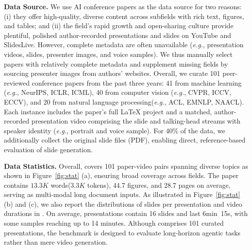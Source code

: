 \vspace{-0.2\baselineskip}
\textbf{Data Source.} We use AI conference papers as the data source for two reasons: (i) they offer high-quality, diverse content across subfields with rich text, figures, and tables; and (ii) the field’s rapid growth and open-sharing culture provide plentiful, polished author-recorded presentations and slides on YouTube and SlidesLive. However, complete metadata are often unavailable (\textit{e.g.}, presentation videos, slides, presenter images, and voice samples). We thus manually select papers with relatively complete metadata and supplement missing fields by sourcing presenter images from authors’ websites. Overall, we curate 101 peer-reviewed conference papers from the past three years: 41 from machine learning (\textit{e.g.}, NeurIPS, ICLR, ICML), 40 from computer vision (\textit{e.g.}, CVPR, ICCV, ECCV), and 20 from natural language processing(\textit{e.g.}, ACL, EMNLP, NAACL).
Each instance includes the paper’s full \LaTeX{} project and a matched, author-recorded presentation video comprising the slide and talking-head streams with speaker identity (\textit{e.g.}, portrait and voice sample). For 40\% of the data, we additionally collect the original slide files (PDF), enabling direct, reference-based evaluation of slide generation.

\vspace{-0.2\baselineskip}
\textbf{Data Statistics.} 
Overall, {\bench} covers 101 paper-video pairs spanning diverse topics as shown in Figure~\ref{fig:stat} (a), ensuring broad coverage across fields. The paper contains $13.3K$ words($3.3K$ tokens), 44.7 figures, and 28.7 pages on average, serving as multi-modal long document inputs. As illustrated in Figure~\ref{fig:stat} (b) and (c), we also report the distributions of slides per presentation and video durations in {\bench}.  On average, presentations contain 16 slides and last 6min~15s, with some samples reaching up to 14 minutes. Although {\bench} comprises 101 curated presentations, the benchmark is designed to evaluate long-horizon agentic tasks rather than mere video generation.

